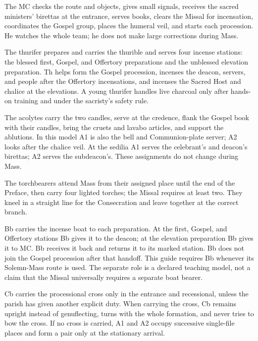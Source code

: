 \begingroup
\renewcommand{\rolecard}[2]{\item[\textbf{#1}] #2}
\begin{description}[leftmargin=0pt,labelindent=0pt,labelwidth=0pt,labelsep=0pt,style=nextline,
  topsep=0.2em,itemsep=0.25em]
\rolecard{Master of ceremonies (MC) --- core model}{The MC checks the route and
objects, gives small signals, receives the sacred ministers' birettas at the
entrance, serves books, clears the Missal for incensation, coordinates the
Gospel group, places the humeral veil, and starts each procession. He watches
the whole team; he does not make large corrections during Mass.}

\rolecard{Thurifer (Th) --- core model}{The thurifer prepares and carries the
thurible and serves four incense stations: the blessed first, Gospel, and
Offertory preparations and the unblessed elevation preparation. Th helps form the Gospel
procession, incenses the deacon, servers, and people after the Offertory
incensations, and incenses the Sacred Host and chalice at the elevations.  A
young thurifer handles live charcoal only after hands-on training and under
the sacristy's safety rule.}

\rolecard{First and second acolytes (A1 and A2) --- core model}{The acolytes
carry the two candles, serve at the credence, flank the Gospel book with their
candles, bring the cruets and lavabo articles, and support the ablutions.  In
this model A1 is also the bell and Communion-plate server; A2 looks after the
chalice veil. At the sedilia A1 serves the celebrant's and deacon's birettas;
A2 serves the subdeacon's. These assignments do not change during Mass.}

\rolecard{Four torchbearers (Tb1--Tb4) --- core model}{The torchbearers attend
Mass from their assigned place until the end of the Preface, then carry four
lighted torches; the Missal requires at least two.  They kneel in a straight
line for the Consecration and leave together at the correct branch.}

\rolecard{Boat bearer (Bb) --- core model}{Bb carries
the incense boat to each preparation. At the first, Gospel, and Offertory
stations Bb gives it to the deacon; at the elevation preparation Bb gives it
to MC. Bb receives it back and returns it to its marked station. Bb does not join the Gospel
procession after that handoff. This guide requires Bb whenever its Solemn-Mass
route is used. The separate role is a declared teaching model, not a claim
that the Missal universally requires a separate boat bearer.}

\rolecard{Cross-bearer (Cb) --- optional local addition}{Cb carries the
processional cross only in the entrance and recessional, unless the parish has
given another explicit duty.  When carrying the cross, Cb remains upright
instead of genuflecting, turns with the whole formation, and never tries to
bow the cross. If no cross is carried, A1 and A2 occupy successive
single-file places and form a pair only at the stationary arrival.}
\end{description}
\endgroup

